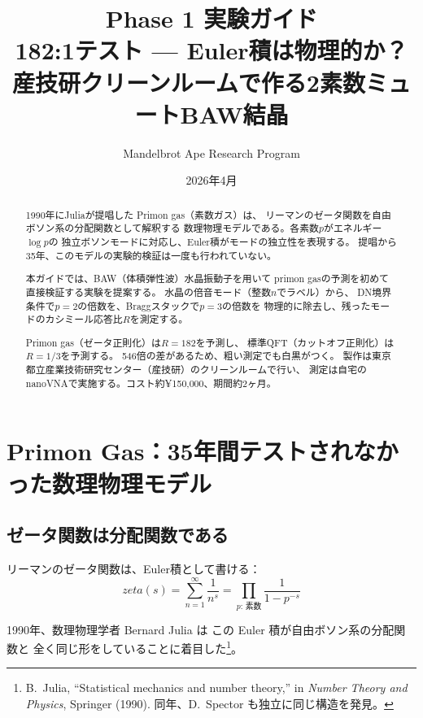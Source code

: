 \documentclass[11pt,a4paper]{article}
\title{Phase 1 実験ガイド\\[6pt]
\large 182:1テスト — Euler積は物理的か？\\[4pt]
\normalsize 産技研クリーンルームで作る2素数ミュートBAW結晶}
\author{Mandelbrot Ape Research Program}
\date{2026年4月}
\def\zeta{zeta}%
\def\textbf#1{#1}%
\begin{document}
\maketitle

\begin{abstract}
1990年にJuliaが提唱した Primon gas（素数ガス）は、
リーマンのゼータ関数を自由ボソン系の分配関数として解釈する
数理物理モデルである。各素数$p$がエネルギー$\log p$の
独立ボソンモードに対応し、Euler積がモードの独立性を表現する。
提唱から35年、このモデルの実験的検証は一度も行われていない。

本ガイドでは、BAW（体積弾性波）水晶振動子を用いて
primon gasの予測を初めて直接検証する実験を提案する。
水晶の倍音モード（整数$n$でラベル）から、
DN境界条件で$p=2$の倍数を、Braggスタックで$p=3$の倍数を
物理的に除去し、残ったモードのカシミール応答比$R$を測定する。

Primon gas（ゼータ正則化）は$R = 182$を予測し、
標準QFT（カットオフ正則化）は$R = 1/3$を予測する。
546倍の差があるため、粗い測定でも白黒がつく。
製作は東京都立産業技術研究センター（産技研）のクリーンルームで行い、
測定は自宅のnanoVNAで実施する。コスト約¥150,000、期間約2ヶ月。
\end{abstract}

\tableofcontents
\newpage

\section{Primon Gas：35年間テストされなかった数理物理モデル}

\subsection{ゼータ関数は分配関数である}

リーマンのゼータ関数は、Euler積として書ける：
\begin{equation}
  \zeta(s) = \sum_{n=1}^{\infty} \frac{1}{n^s}
  = \prod_{p:\,\text{素数}} \frac{1}{1 - p^{-s}}
  \label{eq:euler-product}
\end{equation}

1990年、数理物理学者 Bernard Julia は
この Euler 積が\textbf{自由ボソン系の分配関数}と
全く同じ形をしていることに着目した\footnote{%
B.~Julia, ``Statistical mechanics and number theory,''
in \textit{Number Theory and Physics}, Springer (1990).
同年、D.~Spector も独立に同じ構造を発見。}。
\end{document}
